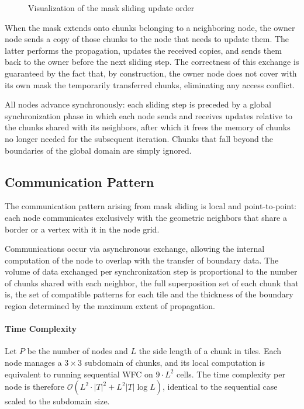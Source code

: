 \begin{figure}[ht]
{{\begin{minipage}{0.8\linewidth}
\end{minipage}
}}
\caption{Visualization of the mask sliding update order}
\label{fig:due}
\end{figure}

When the mask extends onto chunks belonging to a neighboring node, the owner
node sends a copy of those chunks to the node that needs to update them. The
latter performs the propagation, updates the received copies, and sends them
back to the owner before the next sliding step. The correctness of this exchange
is guaranteed by the fact that, by construction, the owner node does not cover
with its own mask the temporarily transferred chunks, eliminating any access
conflict.

All nodes advance synchronously: each sliding step is preceded by a global
synchronization phase in which each node sends and receives updates relative
to the chunks shared with its neighbors, after which it frees the memory of
chunks no longer needed for the subsequent iteration. Chunks that fall beyond
the boundaries of the global domain are simply ignored.

\subsection{Communication Pattern}
The communication pattern arising from mask sliding is local and point-to-point:
each node communicates exclusively with the geometric neighbors that share a
border or a vertex with it in the node grid.

Communications occur via asynchronous exchange, allowing the internal computation of the node to overlap
with the transfer of boundary data. The volume of data exchanged per
synchronization step is proportional to the number of chunks shared with each
neighbor, the full superposition set of each chunk that is, the set of
compatible patterns for each tile and the thickness of the boundary region
determined by the maximum extent of propagation.



\paragraph{Time Complexity}
Let $P$ be the number of nodes and $L$ the side length of a chunk in tiles.
Each node manages a $3 \times 3$ subdomain of chunks, and its local computation
is equivalent to running sequential WFC on $9 \cdot L^2$ cells. The time
complexity per node is therefore $\mathcal{O}(L^2 \cdot |T|^2 + L^2 |T|\log L)$,
identical to the sequential case scaled to the subdomain size.

